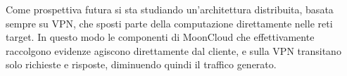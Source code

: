 \documentclass[10pt,a4paper]{article}
\begin{document}

        Come prospettiva futura si sta studiando un'architettura distribuita, basata sempre
        su VPN, che sposti parte della computazione direttamente nelle reti target. In questo
        modo le componenti di MoonCloud che effettivamente raccolgono evidenze agiscono direttamente
        dal cliente, e sulla VPN transitano solo richieste e risposte, diminuendo quindi
        il traffico generato.

    
\end{document}
